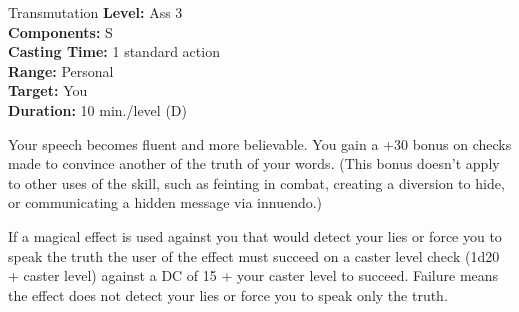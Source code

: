 {Transmutation}
{
	\textbf{Level:}
	Ass 3\\
	\textbf{Components:}
	S\\
	\textbf{Casting Time:}
	1 standard action\\
	\textbf{Range:}
	Personal\\
	\textbf{Target:}
	You\\
	\textbf{Duration:}
	10 min./level (D)\\
}
{
	Your speech becomes fluent and more believable. You gain a +30 bonus on  checks made to convince another of the truth of your words. (This bonus doesn't apply to other uses of the  skill, such as feinting in combat, creating a diversion to hide, or communicating a hidden message via innuendo.)

	If a magical effect is used against you that would detect your lies or force you to speak the truth the user of the effect must succeed on a caster level check (1d20 + caster level) against a DC of 15 + your caster level to succeed. Failure means the effect does not detect your lies or force you to speak only the truth.

}
